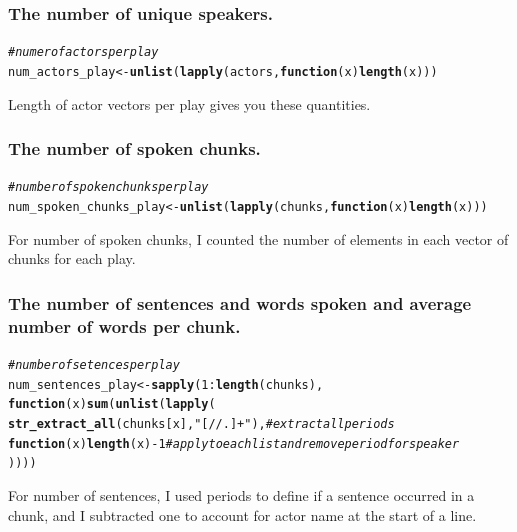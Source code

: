 \documentclass{article}\usepackage[]{graphicx}\usepackage[]{color}
\makeatletter
\newcommand{\hlnum}[1]{\textcolor[rgb]{0.686,0.059,0.569}{#1}}%
\newcommand{\hlstr}[1]{\textcolor[rgb]{0.192,0.494,0.8}{#1}}%
\newcommand{\hlcom}[1]{\textcolor[rgb]{0.678,0.584,0.686}{\textit{#1}}}%
\newcommand{\hlopt}[1]{\textcolor[rgb]{0,0,0}{#1}}%
\newcommand{\hlstd}[1]{\textcolor[rgb]{0.345,0.345,0.345}{#1}}%
\newcommand{\hlkwa}[1]{\textcolor[rgb]{0.161,0.373,0.58}{\textbf{#1}}}%
\newcommand{\hlkwb}[1]{\textcolor[rgb]{0.69,0.353,0.396}{#1}}%
\newcommand{\hlkwc}[1]{\textcolor[rgb]{0.333,0.667,0.333}{#1}}%
\newcommand{\hlkwd}[1]{\textcolor[rgb]{0.737,0.353,0.396}{\textbf{#1}}}%
\newenvironment{kframe}{%
 \def\at@end@of@kframe{}%
 \ifinner\ifhmode%
  \def\at@end@of@kframe{\end{minipage}}%
  \begin{minipage}{\columnwidth}%
 \fi\fi%
 \def\FrameCommand##1{\hskip\@totalleftmargin \hskip-\fboxsep
 \colorbox{shadecolor}{##1}\hskip-\fboxsep
     \hskip-\linewidth \hskip-\@totalleftmargin \hskip\columnwidth}%
 \MakeFramed {\advance\hsize-\width
   \@totalleftmargin\z@ \linewidth\hsize
   \@setminipage}}%
 {\par\unskip\endMakeFramed%
 \at@end@of@kframe}
\newenvironment{knitrout}{}{} %
\makeatother
\begin{document}
\subsubsection{The number of unique speakers.}
\begin{knitrout}
\color{fgcolor}\begin{kframe}
\begin{alltt}
\hlcom{#numer of actors per play}
\hlstd{num_actors_play} \hlkwb{<-} \hlkwd{unlist}\hlstd{(}\hlkwd{lapply}\hlstd{(actors,} \hlkwa{function}\hlstd{(}\hlkwc{x}\hlstd{)} \hlkwd{length}\hlstd{(x)))}
\end{alltt}
\end{kframe}
\end{knitrout}
Length of actor vectors per play gives you these quantities.
\subsubsection{The number of spoken chunks.}
\begin{knitrout}
\color{fgcolor}\begin{kframe}
\begin{alltt}
\hlcom{#number of spoken chunks per play}
\hlstd{num_spoken_chunks_play} \hlkwb{<-} \hlkwd{unlist}\hlstd{(}\hlkwd{lapply}\hlstd{(chunks,} \hlkwa{function}\hlstd{(}\hlkwc{x}\hlstd{)} \hlkwd{length}\hlstd{(x)))}
\end{alltt}
\end{kframe}
\end{knitrout}
For number of spoken chunks, I counted the number of elements in each vector of chunks for each play.

\subsubsection{The number of sentences and words spoken and average number of words per chunk.}
\begin{knitrout}
\color{fgcolor}\begin{kframe}
\begin{alltt}
\hlcom{#number of setences per play}
\hlstd{num_sentences_play} \hlkwb{<-} \hlkwd{sapply}\hlstd{(}\hlnum{1}\hlopt{:}\hlkwd{length}\hlstd{(chunks),}
       \hlkwa{function}\hlstd{(}\hlkwc{x}\hlstd{)} \hlkwd{sum}\hlstd{(}\hlkwd{unlist}\hlstd{(}\hlkwd{lapply}\hlstd{(}
           \hlkwd{str_extract_all}\hlstd{(chunks[x],}\hlstr{"[//.]+"}\hlstd{),} \hlcom{#extract all periods}
            \hlkwa{function}\hlstd{(}\hlkwc{x}\hlstd{)} \hlkwd{length}\hlstd{(x)}\hlopt{-}\hlnum{1} \hlcom{#apply to each list and remove period for speaker}
\hlstd{))))}
\end{alltt}
\end{kframe}
\end{knitrout}
For number of sentences, I used periods to define if a sentence occurred in a chunk, and I subtracted one to account for actor name at the start of a line.
\end{document}
